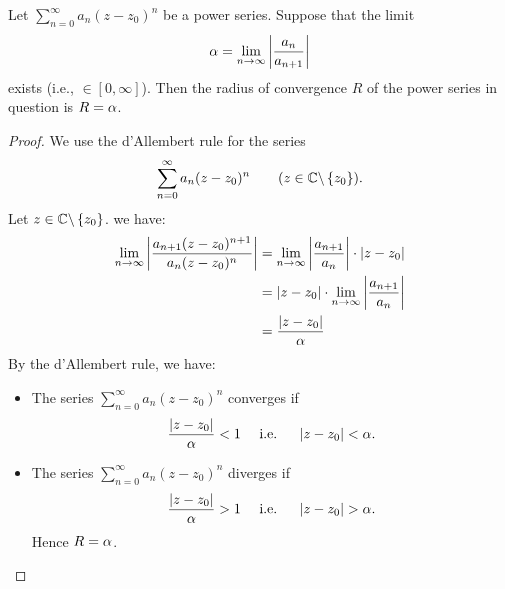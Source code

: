 \begin{proposition}
  Let $\sum_{n=0}^{\infty} a_n (z-z_0) ^n  $ be a power series. Suppose that the limit 
  \[
  \alpha = \lim_{n \to \infty}
  \left| 
  \frac{a_n }{a_{n+1}}
  \right|
  \]
  exists (i.e., $\in  [0, \infty ]$). Then the radius of convergence $R $ of the power series in question is 
  $R = \alpha$. 
\end{proposition}
\begin{proof}
We use the d'Allembert rule for the series 
\[
\sum_{n=0}^{\infty} a_n (z-z_0) ^n \quad \quad   (z \in  \mathbb{C} \backslash \left\{ z_0 \right\})  .
\]
Let $z \in \mathbb{C} \backslash \left\{ z_0 \right\} $. we have: 
\begin{align*}
  \lim_{n \to \infty} \left| \frac{a_{n+1}(z-z_0) ^{n+1}}{a_n (z-z_0) ^n } \right| 
  &=
  \lim_{n \to \infty} \left| \frac{a_{n+1}}{a_n } \right| \cdot 
  \left| z-z_0 \right| \\
  &= 
  \left| z-z_0 \right|\cdot \lim_{n \to \infty} \left| \frac{a_{n+1}}{a_n } \right| \\
  &= \frac{\left| z-z_0 \right|}{\alpha}
\end{align*}
By the d'Allembert rule, we have: 
\begin{itemize}
  \item[\ding{49}] The series $\sum_{n=0}^{\infty} a_n (z-z_0) ^n  $ 
    converges if 
    \[
    \frac{\left| z-z_0 \right|}{\alpha}< 1 \quad  \text{ i.e. } 
    \quad 
    \left| z-z_0 \right|< \alpha.
    \]
  \item[\ding{49}]
      The series $\sum_{n=0}^{\infty} a_n (z-z_0) ^n $ 
      diverges if 
      \[
      \frac{\left| z-z_0 \right|}{\alpha} > 1 
      \quad 
      \text{ i.e. } \quad   \left| z-z_0 \right| > \alpha.
      \]
      Hence $R = \alpha$. 
\end{itemize}
\end{proof}
